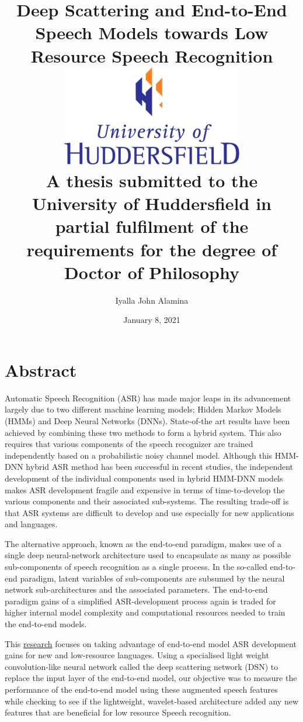 \documentclass[12pt,twoside]{report}
\title{
    {Deep Scattering and End-to-End Speech Models towards Low Resource Speech Recognition}\\
    {\includegraphics{university.png}\\
A thesis submitted to the University of Huddersfield in partial fulfilment of the requirements for the degree of Doctor of Philosophy}
}
\author{Iyalla John Alamina}
\date{January 8, 2021}
\begin{document}
\makeglossaries


\maketitle
\DeclareRobustCommand{\startblue}{%
  \leavevmode
  \color{blue}
}
\DeclareRobustCommand{\stopblue}{%
  \normalcolor
}


\chapter*{Abstract}
\startblue
Automatic Speech Recognition (ASR) has made major leaps in its advancement largely due to two different machine learning models; Hidden Markov Models (HMMs) and Deep Neural Networks (DNNs).  State-of-the art results have been achieved by combining these two methods to form a hybrid system.  This also requires that various components of the speech recognizer are trained independently based on a probabilistic noisy channel model.  Although this HMM-DNN hybrid ASR method has been successful in recent studies, the independent development of the individual components used in hybrid HMM-DNN models makes ASR development fragile and expensive in terms of time-to-develop the various components and their associated sub-systems.  The resulting trade-off is that ASR systems are difficult to develop and use especially for new applications and languages.

The alternative approach, known as the end-to-end paradigm, makes use of a single deep neural-network architecture used to encapsulate as many as possible sub-components of speech recognition as a single process.  In the so-called end-to-end paradigm, latent variables of sub-components are subsumed by the neural network sub-architectures and the associated parameters.  The end-to-end paradigm gains of a simplified ASR-development process again is traded for higher internal model complexity and computational resources needed to train the end-to-end models. 

This \href{https://docs.google.com/document/d/1ne2ctaxjpOlilMDg88aTtzOdIyP-wI2_ST5mGDvAYMw/edit?usp=sharing}{research} focuses on taking advantage of end-to-end model ASR development gains for new and low-resource languages. Using a specialised light weight convolution-like neural network called the deep scattering network (DSN) to replace the input layer of the end-to-end model, our objective was to measure the performance of the end-to-end model using these augmented speech features while checking to see if the lightweight, wavelet-based architecture added any new features that are beneficial for low resource Speech recognition. 
\end{document}
